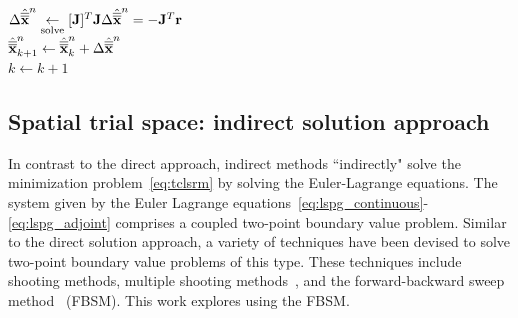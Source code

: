 \begin{algorithm}
{%
$\Delta \hat{\overline{\overline{\mathbf {x}}}}^{n} \underset{\text{solve}}{\leftarrow} [\mathbf{J}]^T \mathbf{J} \Delta \hat{\overline{\overline{\mathbf {x}}}}^{n}=  -\mathbf{J}^T\mathbf{r}$  \\
$\hat{\overline{\overline{\mathbf {x}}}}^{n}_{k+1} \leftarrow \hat{\overline{\overline{\mathbf {x}}}}^{n}_k + \Delta \hat{\overline{\overline{\mathbf {x}}}}^{n}$  \\
$k\leftarrow k+1$
}
\end{algorithm}


%

\subsection{Spatial trial space: indirect solution approach}\label{sec:indirect}
In contrast to the direct approach,
indirect methods ``indirectly" solve the minimization
problem~\eqref{eq:tclsrm} by solving the Euler-Lagrange equations. The
system given by the Euler Lagrange equations~\eqref{eq:lspg_continuous}-\eqref{eq:lspg_adjoint} comprises a coupled two-point boundary value
problem. Similar to the direct solution approach, a variety of techniques have
been devised to solve two-point boundary value problems of this type. These
techniques include shooting methods, multiple shooting
methods~\cite{multiple_shooting}, and the forward-backward sweep
method~\cite{fbs} (FBSM).  This work explores using the FBSM. 


